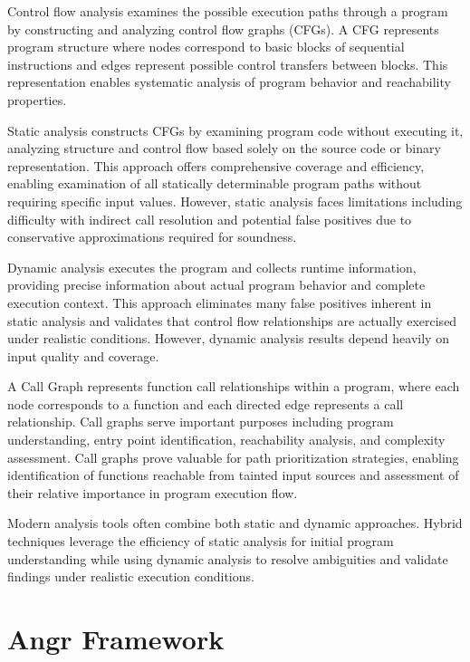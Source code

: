 Control flow analysis examines the possible execution paths through a program by constructing and analyzing control flow graphs (CFGs). A CFG represents program structure where nodes correspond to basic blocks of sequential instructions and edges represent possible control transfers between blocks. This representation enables systematic analysis of program behavior and reachability properties.

Static analysis constructs CFGs by examining program code without executing it, analyzing structure and control flow based solely on the source code or binary representation. This approach offers comprehensive coverage and efficiency, enabling examination of all statically determinable program paths without requiring specific input values. However, static analysis faces limitations including difficulty with indirect call resolution and potential false positives due to conservative approximations required for soundness.

Dynamic analysis executes the program and collects runtime information, providing precise information about actual program behavior and complete execution context. This approach eliminates many false positives inherent in static analysis and validates that control flow relationships are actually exercised under realistic conditions. However, dynamic analysis results depend heavily on input quality and coverage.

A Call Graph represents function call relationships within a program, where each node corresponds to a function and each directed edge represents a call relationship. Call graphs serve important purposes including program understanding, entry point identification, reachability analysis, and complexity assessment. Call graphs prove valuable for path prioritization strategies, enabling identification of functions reachable from tainted input sources and assessment of their relative importance in program execution flow.

Modern analysis tools often combine both static and dynamic approaches. Hybrid techniques leverage the efficiency of static analysis for initial program understanding while using dynamic analysis to resolve ambiguities and validate findings under realistic execution conditions.

\section{Angr Framework}

